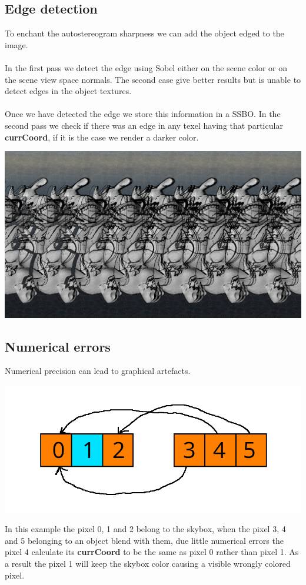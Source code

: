 \documentclass[12pt, a4paper]{article}
\begin{document}
\subsection{Edge detection}
To enchant the autostereogram sharpness we can add the object edged to the image.\\\\
In the first pass we detect the edge using Sobel either on the scene color or on the scene view space normals. The second case give better results 
but is unable to detect edges in the object textures.\\\\
Once we have detected the edge we store this information in a SSBO. In the second pass we check if there was an edge in any texel having
that particular \textbf{currCoord}, if it is the case we render a darker color.
\begin{center}
    \centering
    \includegraphics[width=1.0\textwidth]{img/edge.png}
\end{center}

\subsection{Numerical errors}
Numerical precision can lead to graphical artefacts.
\begin{center}
    \centering
    \includegraphics[width=1.0\textwidth]{img/pixel.png}
\end{center}
In this example the pixel 0, 1 and 2 belong to the skybox, when
the pixel 3, 4 and 5 belonging to an object blend with them, due little numerical
errors the pixel 4 calculate its \textbf{currCoord} to be the same as pixel 0 rather
than pixel 1. As a result the pixel 1 will keep the skybox color causing a visible
wrongly colored pixel.
\end{document}
